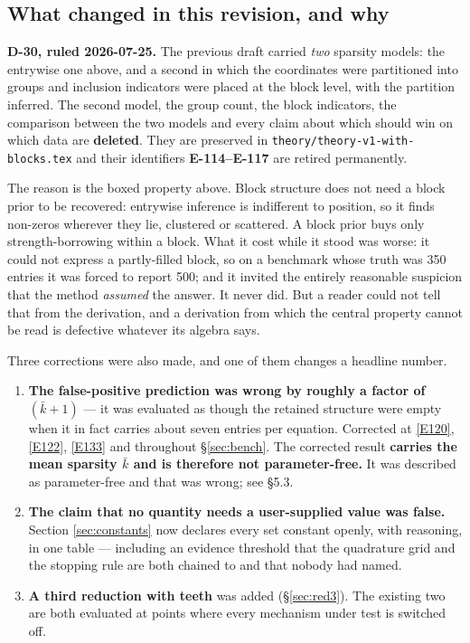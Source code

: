 \subsection*{What changed in this revision, and why}

\textbf{D-30, ruled 2026-07-25.} The previous draft carried \emph{two} sparsity
models: the entrywise one above, and a second in which the coordinates were
partitioned into groups and inclusion indicators were placed at the block level, with
the partition inferred. The second model, the group count, the block indicators, the
comparison between the two models and every claim about which should win on which
data are \textbf{deleted}. They are preserved in
\texttt{theory/theory-v1-with-blocks.tex} and their identifiers
\textbf{E-114--E-117} are retired permanently.

The reason is the boxed property above. Block structure does not need a block prior
to be recovered: entrywise inference is indifferent to position, so it finds
non-zeros wherever they lie, clustered or scattered. A block prior buys only
strength-borrowing within a block. What it cost while it stood was worse: it could
not express a partly-filled block, so on a benchmark whose truth was 350 entries it
was forced to report 500; and it invited the entirely reasonable suspicion that the
method \emph{assumed} the answer. It never did. But a reader could not tell that from
the derivation, and a derivation from which the central property cannot be read is
defective whatever its algebra says.

Three corrections were also made, and one of them changes a headline number.
\begin{enumerate}[label=(\roman*), topsep=0pt, itemsep=0pt]
\item \textbf{The false-positive prediction was wrong by roughly a factor of
  $(\bar k+1)$} --- it was evaluated as though the retained structure were empty
  when it in fact carries about seven entries per equation. Corrected at
  \eqref{E120}, \eqref{E122}, \eqref{E133} and throughout \S\ref{sec:bench}. The
  corrected result \textbf{carries the mean sparsity $\bar k$ and is therefore not
  parameter-free.} It was described as parameter-free and that was wrong; see \S5.3.
\item \textbf{The claim that no quantity needs a user-supplied value was false.}
  Section \ref{sec:constants} now declares every set constant openly, with reasoning,
  in one table --- including an evidence threshold that the quadrature grid and the
  stopping rule are both chained to and that nobody had named.
\item \textbf{A third reduction with teeth} was added (\S\ref{sec:red3}). The
  existing two are both evaluated at points where every mechanism under test is
  switched off.
\end{enumerate}


